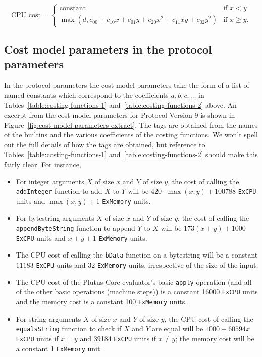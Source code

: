 \documentclass[a4paper]{article}
\newcommand\const{\ensuremath{\text{constant}}}
\begin{document}
$$
\text{CPU cost} = \begin{cases}
  \const & \text{if $x<y$} \\
  \max(d, c_{00} + c_{10}x + c_{01}y + c_{20}x^2 + c_{11}xy + c_{02}y^2) & \text{if $x \geq y$}.
\end{cases}
$$

\subsection{Cost model parameters in the protocol parameters}
\label{sec:cost-model-parameters}
In the protocol parameters the cost model parameters take the form of a list of
named constants which correspond to the coefficients $a, b, c, \ldots$ in
Tables~\ref{table:costing-functions-1} and~\ref{table:costing-functions-2}
above.  An excerpt from the cost model parameters for Protocol Version 9 is
shown in Figure~\ref{fig:cost-model-parameters-extract}.  The tags are obtained
from the names of the builtins and the various coefficients of the costing
functions.  We won't spell out the full details of how the tags are obtained,
but reference to Tables~\ref{table:costing-functions-1}
and~\ref{table:costing-functions-2} should make this fairly clear.  For
instance,
\begin{itemize}
\item For integer arguments $X$ of size $x$ and $Y$ of size $y$, the cost of
  calling the \texttt{addInteger} function to add $X$ to $Y$ will be
  $420\cdot\max(x,y) + 100788$ \texttt{ExCPU} units and $\max(x,y)+1$
  \texttt{ExMemory} units.
\item For bytestring arguments $X$ of size $x$ and $Y$ of size $y$, the cost of
  calling the \texttt{appendByteString} function to append $Y$ to $X$ will be
  $173(x+y)+1000$ \texttt{ExCPU} units and $x+y+1$ \texttt{ExMemory} units.
\item The CPU cost of calling the \texttt{bData} function on a bytestring will
  be a constant $11183$ \texttt{ExCPU} units and $32$ \texttt{ExMemory} units,
  irrespective of the size of the input.
\item The CPU cost of the Plutus Core evaluator's basic \texttt{apply} operation
  (and all of the other basic operations (machine steps)) is a constant 16000
  \texttt{ExCPU} units and the memory cost is a constant 100 \texttt{ExMemory}
  units.
\item For string arguments $X$ of size $x$ and $Y$ of size $y$, the CPU cost of
  calling the \texttt{equalsString} function to check if $X$ and $Y$ are equal
  will be $1000 + 60594x$ \texttt{ExCPU} units if $x=y$ and 39184 \texttt{ExCPU}
  units if $x \neq y$; the memory cost will be a constant 1 \texttt{ExMemory}
  unit.
\end{itemize}
\end{document}
